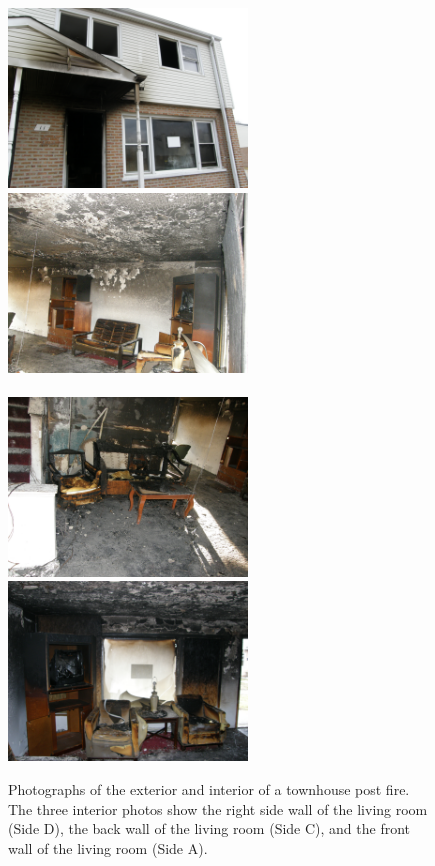 \documentclass[twoside]{uocthesis}
\begin{document}
{\begin{figure}[ht!]
	\centering
		\includegraphics[width=2.5in]{../Figures/EXT_SideA}
		\includegraphics[width=2.5in]{../Figures/INT_SideD}\\
		\hspace{3 mm}  \\
		\includegraphics[width=2.5in]{../Figures/INT_SideC}
		\includegraphics[width=2.5in]{../Figures/INT_SideA}\\
	\caption[Photographs of the exterior and interior of a townhouse post fire]{Photographs of the exterior and interior of a townhouse post fire. The three interior photos show the right side wall of the living room (Side D), the back wall of the living room (Side C), and the front wall of the living room (Side A).}
	\label{EXT_INTLR}
\end{figure}

}
\end{document}
